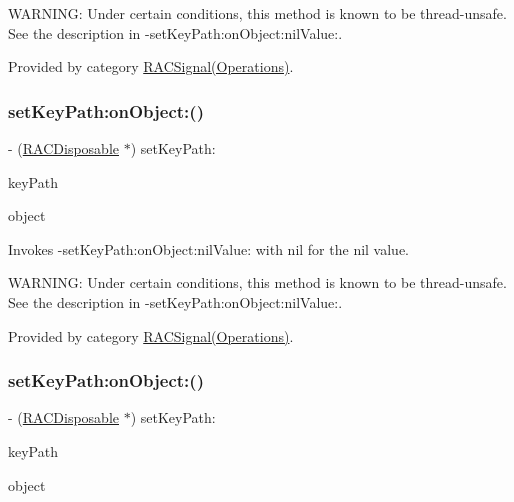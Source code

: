 W\+A\+R\+N\+I\+NG\+: Under certain conditions, this method is known to be thread-\/unsafe. See the description in -\/set\+Key\+Path\+:on\+Object\+:nil\+Value\+:. 

Provided by category \mbox{\hyperlink{category_r_a_c_signal_07_operations_08_ada2a2f51a30fb8bef13819c50ebfbf85}{R\+A\+C\+Signal(\+Operations)}}.

\mbox{\label{interface_r_a_c_signal_ada2a2f51a30fb8bef13819c50ebfbf85}} 
\subsubsection{\texorpdfstring{set\+Key\+Path\+:on\+Object\+:()}{setKeyPath:onObject:()}\hspace{0.1cm}{\footnotesize\ttfamily [2/3]}}
{\footnotesize\ttfamily -\/ (\mbox{\hyperlink{interface_r_a_c_disposable}{R\+A\+C\+Disposable}} $\ast$) set\+Key\+Path\+: \begin{DoxyParamCaption}\item[{(N\+S\+String $\ast$)}]{key\+Path }\item[{onObject:(N\+S\+Object $\ast$)}]{object }\end{DoxyParamCaption}}

Invokes -\/set\+Key\+Path\+:on\+Object\+:nil\+Value\+: with {\ttfamily nil} for the nil value.

W\+A\+R\+N\+I\+NG\+: Under certain conditions, this method is known to be thread-\/unsafe. See the description in -\/set\+Key\+Path\+:on\+Object\+:nil\+Value\+:. 

Provided by category \mbox{\hyperlink{category_r_a_c_signal_07_operations_08_ada2a2f51a30fb8bef13819c50ebfbf85}{R\+A\+C\+Signal(\+Operations)}}.

\mbox{\label{interface_r_a_c_signal_ada2a2f51a30fb8bef13819c50ebfbf85}} 
\subsubsection{\texorpdfstring{set\+Key\+Path\+:on\+Object\+:()}{setKeyPath:onObject:()}\hspace{0.1cm}{\footnotesize\ttfamily [3/3]}}
{\footnotesize\ttfamily -\/ (\mbox{\hyperlink{interface_r_a_c_disposable}{R\+A\+C\+Disposable}} $\ast$) set\+Key\+Path\+: \begin{DoxyParamCaption}\item[{(N\+S\+String $\ast$)}]{key\+Path }\item[{onObject:(N\+S\+Object $\ast$)}]{object }\end{DoxyParamCaption}}

